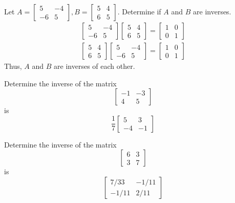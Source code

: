 \documentclass[letterpaper,12pt]{article}
\begin{document}
\begin{example}
Let $A = \begin{bmatrix} 5 & -4 \\ -6 & 5 \end{bmatrix}, B = \begin{bmatrix} 5 & 4 \\ 6 & 5 \end{bmatrix}$. Determine if $A$ and $B$ are inverses.
\begin{align*}
    \begin{bmatrix} 5 & -4 \\ -6 & 5 \end{bmatrix} \begin{bmatrix} 5 & 4 \\ 6 & 5 \end{bmatrix} = \begin{bmatrix} 1 & 0 \\ 0 & 1 \end{bmatrix} \\
    \begin{bmatrix} 5 & 4 \\ 6 & 5 \end{bmatrix} \begin{bmatrix} 5 & -4 \\ -6 & 5 \end{bmatrix} = \begin{bmatrix} 1 & 0 \\ 0 & 1 \end{bmatrix}
\end{align*}
Thus, $A$ and $B$ are inverses of each other.
\end{example}

\begin{example}
Determine the inverse of the matrix
\begin{equation*}
    \begin{bmatrix} -1 & -3 \\ 4 & 5 \end{bmatrix}
\end{equation*}
is
\begin{equation*}
    \dfrac{1}{7} \begin{bmatrix} 5 & 3 \\ -4 & -1 \end{bmatrix}
\end{equation*}
\end{example}

\begin{example}
Determine the inverse of the matrix
\begin{equation*}
    \begin{bmatrix} 6 & 3 \\ 3 & 7 \end{bmatrix}
\end{equation*}
is
\begin{equation*}
    \begin{bmatrix} 7/33 & -1/11 \\ -1/11 & 2/11 \end{bmatrix}
\end{equation*}
\end{example}
\end{document}
